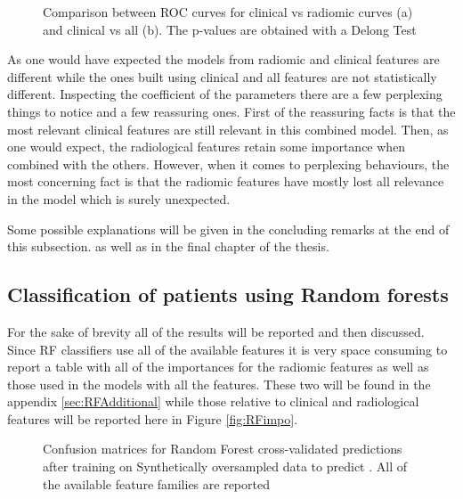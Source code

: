 \begin{figure}[H]
\centering
        \caption{Comparison between ROC curves for clinical vs radiomic curves (a) and clinical vs all (b). The p-values are obtained with a Delong Test }\label{fig:delongDeath}
\end{figure}

As one would have expected the models from radiomic and clinical features are different while the ones built using clinical and all features are not statistically different.
Inspecting the coefficient of the parameters there are a few perplexing things to notice and a few reassuring ones. First of the reassuring facts is that the most relevant clinical features are still relevant in this combined model. 
Then, as one would expect, the radiological features retain some importance when combined with the others. However, when it comes to perplexing behaviours, the most concerning fact is that the radiomic features have mostly lost all relevance in the model which is surely unexpected.

Some possible explanations will be given in the concluding remarks at the end of this  subsection. as well as in the final chapter of the thesis.

\subsection{Classification of patients using Random forests}
For the sake of brevity all of the results will be reported and then discussed. Since RF classifiers use all of the available features it is very space consuming to report a table with all of the importances for the radiomic features as well as those used in the models with all the features. These two will be found in the appendix \ref{sec:RFAdditional} while those relative to clinical and radiological features will be reported here in Figure \ref{fig:RFimpo}.

\begin{figure}[H]
\centering
	\newline
        \caption{Confusion matrices for Random Forest cross-validated predictions after training on Synthetically oversampled data to predict \death. All of the available feature families are reported}\label{fig:RFDeath}
\end{figure}


